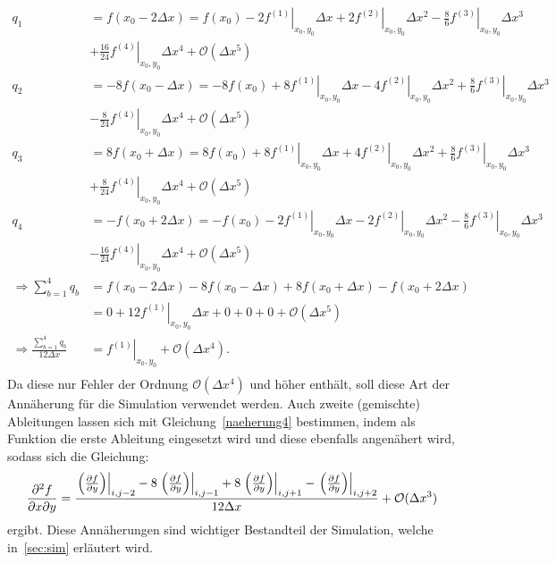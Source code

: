 \begin{align*}
    q_1 &= f(x_0 -2\Delta x) = f(x_0) -2\left.f^{(1)}\right\vert_{x_0,y_0} \Delta x + 2 \left.f^{(2)}\right\vert_{x_0,y_0} \Delta x^2 - \frac{8}{6} \left.f^{(3)}\right\vert_{x_0,y_0} \Delta x^3 \\
    &+ \frac{16}{24}\left.f^{(4)}\right\vert_{x_0,y_0} \Delta x^4 + \mathcal{O}(\Delta x ^5) \\
    q_2 &= -8f(x_0 -\Delta x) = -8f(x_0)+8\left.f^{(1)}\right\vert_{x_0,y_0} \Delta x -4 \left.f^{(2)}\right\vert_{x_0,y_0} \Delta x^2 + \frac{8}{6} \left.f^{(3)}\right\vert_{x_0,y_0} \Delta x^3 \\
    &- \frac{8}{24}\left.f^{(4)}\right\vert_{x_0,y_0} \Delta x ^4+ \mathcal{O}(\Delta x ^5) \\
    q_3 &= 8f(x_0 +\Delta x) = 8f(x_0) +8\left.f^{(1)}\right\vert_{x_0,y_0} \Delta x +4 \left.f^{(2)}\right\vert_{x_0,y_0} \Delta x^2 + \frac{8}{6} \left.f^{(3)}\right\vert_{x_0,y_0} \Delta x^3 \\
    &+ \frac{8}{24}\left.f^{(4)}\right\vert_{x_0,y_0} \Delta x ^4+ \mathcal{O}(\Delta x ^5) \\
    q_4 &= -f(x_0 +2\Delta x) = -f(x_0) -2\left.f^{(1)}\right\vert_{x_0,y_0} \Delta x -2 \left.f^{(2)}\right\vert_{x_0,y_0} \Delta x^2 - \frac{8}{6} \left.f^{(3)}\right\vert_{x_0,y_0} \Delta x^3 \\
    &- \frac{16}{24}\left.f^{(4)}\right\vert_{x_0,y_0} \Delta x^4 + \mathcal{O}(\Delta x ^5) \\
    \Rightarrow \sum_{b=1}^{4} q_b &= f(x_0-2\Delta x) - 8f(x_0 - \Delta x) + 8f(x_0 + \Delta x) - f(x_0 + 2\Delta x) \\
    &= 0 + 12 \left.f^{(1)}\right\vert_{x_0 , y_0} \Delta x + 0 + 0 + 0 + \mathcal{O}(\Delta x^5) \\
    \Rightarrow \frac{\sum_{b=1}^{4} q_b}{12\Delta x} &= \left.f^{(1)}\right\vert_{x_0 , y_0} + \mathcal{O}(\Delta x^4). \\
\end{align*}
Da diese nur Fehler der Ordnung $\mathcal{O}(\Delta x^4)$ und höher enthält, soll diese Art der Annäherung für die Simulation verwendet werden.
Auch zweite (gemischte) Ableitungen lassen sich mit Gleichung~\ref{naeherung4} bestimmen, indem als Funktion die erste Ableitung eingesetzt wird und diese ebenfalls angenähert wird, sodass sich die Gleichung:
\begin{align*}
    \frac{\partial^2 f}{\partial x \partial y} &= \frac{\left.\left( \frac{\partial f}{\partial y}\right)\right\lvert_{i,j-2} - 8\left.\left( \frac{\partial f}{\partial y}\right)\right\lvert_{i,j-1}+8\left.\left( \frac{\partial f}{\partial y}\right)\right\lvert_{i,j+1}-\left.\left( \frac{\partial f}{\partial y}\right)\right\lvert_{i,j+2}}{12\Delta x} + \mathcal{O}(\Delta x^3) \\
\end{align*}
ergibt.
Diese Annäherungen sind wichtiger Bestandteil der Simulation, welche in~\autoref{sec:sim} erläutert wird.

